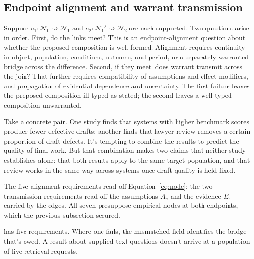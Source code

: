 \documentclass[12pt]{article}
\begin{document}
\subsection{Endpoint alignment and warrant transmission}\label{ssec:interfaces}

Suppose \(e_1:\mathcal{N}_0\rightsquigarrow\mathcal{N}_1\) and \(e_2:\mathcal{N}_1'\rightsquigarrow\mathcal{N}_2\) are each supported. Two questions arise in order. First, do the links meet? This is an endpoint-alignment question about whether the proposed composition is well formed. Alignment requires continuity in object, population, conditions, outcome, and period, or a separately warranted bridge across the difference. Second, if they meet, does warrant transmit across the join? That further requires compatibility of assumptions and effect modifiers, and propagation of evidential dependence and uncertainty. The first failure leaves the proposed composition ill-typed as stated; the second leaves a well-typed composition unwarranted.

Take a concrete pair. One study finds that systems with higher benchmark scores produce fewer defective drafts; another finds that lawyer review removes a certain proportion of draft defects. It's tempting to combine the results to predict the quality of final work. But that combination makes two claims that neither study establishes alone: that both results apply to the same target population, and that review works in the same way across systems once draft quality is held fixed.

The five alignment requirements read off Equation~\ref{eq:node}; the two transmission requirements read off the assumptions \(A_e\) and the evidence \(E_e\) carried by the edges. All seven presuppose empirical nodes at both endpoints, which the previous subsection secured.

 has five requirements. Where one fails, the mismatched field identifies the bridge that's owed. A result about supplied-text questions doesn't arrive at a population of live-retrieval requests.
\end{document}
